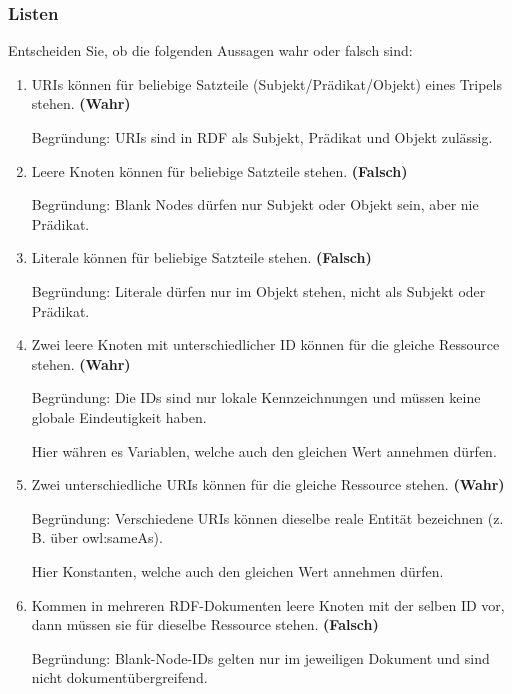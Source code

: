 \documentclass[a4paper]{article}
\begin{document}
\subsubsection{Listen}



Entscheiden Sie, ob die folgenden Aussagen wahr oder falsch sind:


\begin{enumerate}
    \item URIs können für beliebige Satzteile (Subjekt/Prädikat/Objekt) eines Tripels stehen. \textbf{(Wahr)}

    Begründung: URIs sind in RDF als Subjekt, Prädikat und Objekt zulässig.


    \item Leere Knoten können für beliebige Satzteile stehen. \textbf{(Falsch)}

    Begründung: Blank Nodes dürfen nur Subjekt oder Objekt sein, aber nie Prädikat.


    \item Literale können für beliebige Satzteile stehen. \textbf{(Falsch)}

    Begründung: Literale dürfen nur im Objekt stehen, nicht als Subjekt oder Prädikat.


    \item Zwei leere Knoten mit unterschiedlicher ID können für die gleiche Ressource stehen. \textbf{(Wahr)}

    Begründung: Die IDs sind nur lokale Kennzeichnungen und müssen keine globale Eindeutigkeit haben.

    Hier währen es Variablen, welche auch den gleichen Wert annehmen dürfen.


    \item Zwei unterschiedliche URIs können für die gleiche Ressource stehen. \textbf{(Wahr)}

    Begründung: Verschiedene URIs können dieselbe reale Entität bezeichnen (z. B. über owl:sameAs).

    Hier Konstanten, welche auch den gleichen Wert annehmen dürfen.


    \item Kommen in mehreren RDF-Dokumenten leere Knoten mit der selben ID vor, dann müssen
    sie für dieselbe Ressource stehen. \textbf{(Falsch)}

    Begründung: Blank-Node-IDs gelten nur im jeweiligen Dokument und sind nicht dokumentübergreifend.



\end{enumerate}
\end{document}
